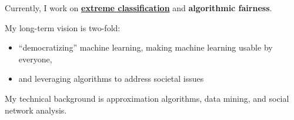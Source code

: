 \bigskip
\bigskip

Currently, I work on \href{http://manikvarma.org/downloads/XC/XMLRepository.html}{{\bf extreme classification\/}} and {\bf algorithmic fairness\/}.

\bigskip

My long-term vision is two-fold:

\begin{itemize}
  \item{``democratizing'' machine learning, making machine learning usable by everyone, }
  \item{and leveraging algorithms to address societal issues}
\end{itemize}
My technical background is approximation algorithms, data mining, and social network analysis.

